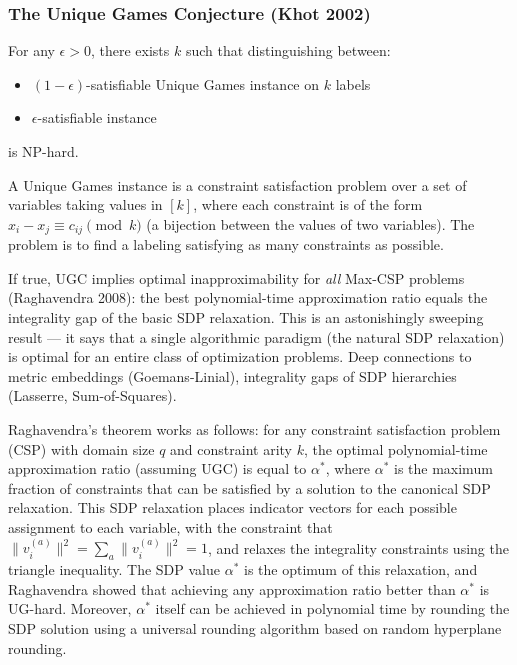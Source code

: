 \subsubsection*{The Unique Games Conjecture (Khot 2002)}

\begin{conjecture}
For any $\epsilon > 0$, there exists $k$ such that distinguishing between:
\begin{itemize}
\item $(1-\epsilon)$-satisfiable Unique Games instance on $k$ labels
\item $\epsilon$-satisfiable instance
\end{itemize}
is NP-hard.
\end{conjecture}

A Unique Games instance is a constraint satisfaction problem over a set of variables taking values in $[k]$, where each constraint is of the form $x_i - x_j \equiv c_{ij} \pmod{k}$ (a bijection between the values of two variables). The problem is to find a labeling satisfying as many constraints as possible.

If true, UGC implies optimal inapproximability for \emph{all} Max-CSP problems (Raghavendra 2008): the best polynomial-time approximation ratio equals the integrality gap of the basic SDP relaxation. This is an astonishingly sweeping result — it says that a single algorithmic paradigm (the natural SDP relaxation) is optimal for an entire class of optimization problems. Deep connections to metric embeddings (Goemans-Linial), integrality gaps of SDP hierarchies (Lasserre, Sum-of-Squares).

Raghavendra's theorem works as follows: for any constraint satisfaction problem (CSP) with domain size $q$ and constraint arity $k$, the optimal polynomial-time approximation ratio (assuming UGC) is equal to $\alpha^*$, where $\alpha^*$ is the maximum fraction of constraints that can be satisfied by a solution to the canonical SDP relaxation. This SDP relaxation places indicator vectors for each possible assignment to each variable, with the constraint that $\|v_i^{(a)}\|^2 = \sum_a \|v_i^{(a)}\|^2 = 1$, and relaxes the integrality constraints using the triangle inequality. The SDP value $\alpha^*$ is the optimum of this relaxation, and Raghavendra showed that achieving any approximation ratio better than $\alpha^*$ is UG-hard. Moreover, $\alpha^*$ itself can be achieved in polynomial time by rounding the SDP solution using a universal rounding algorithm based on random hyperplane rounding.

